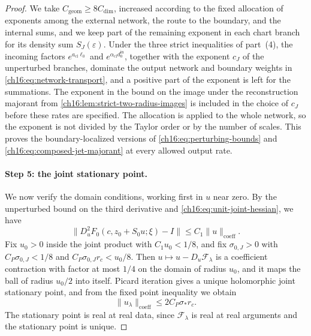\begin{proof}
We take $C_{\mathrm{geom}}\ge8C_{\mathrm{dim}}$, increased according to the fixed allocation of exponents among the external network, the route to the boundary, and the internal sums, and we keep part of the remaining exponent in each chart branch for its density sum $S_J(\varepsilon)$. Under the three strict inequalities of part~(4), the incoming factors $e^{a_{\mathrm{cl}}\ell_0}$ and $e^{\alpha_{\mathrm{cl}}d_0^{\mathrm{in}}}$, together with the exponent $c_J$ of the unperturbed branches, dominate the output network and boundary weights in \eqref{ch16:eq:network-transport}, and a positive part of the exponent is left for the summations. The exponent in the bound on the image under the reconstruction majorant from \cref{ch16:lem:strict-two-radius-images} is included in the choice of $c_J$ before these rates are specified. The allocation is applied to the whole network, so the exponent is not divided by the Taylor order or by the number of scales. This proves the boundary-localized versions of \eqref{ch16:eq:perturbing-bounds} and \eqref{ch16:eq:composed-jet-majorant} at every allowed output rate.

\paragraph{Step 5: the joint stationary point.}
We now verify the domain conditions, working first in $u$ near zero. By the unperturbed bound on the third derivative and \eqref{ch16:eq:unit-joint-hessian}, we have
\[
 \|D_u^2F_0(c,z_0+S_0u;\xi)-I\|\le C_1\|u\|_{\mathrm{coeff}}.
\]
Fix $u_0>0$ inside the joint product with $C_1u_0<1/8$, and fix $\sigma_{0,J}>0$ with $C_P\sigma_{0,J}<1/8$ and $C_P\sigma_{0,J}r_c<u_0/8$. Then $u\mapsto u-D_u\mathcal F_\lambda$ is a coefficient contraction with factor at most $1/4$ on the domain of radius $u_0$, and it maps the ball of radius $u_0/2$ into itself. Picard iteration gives a unique holomorphic joint stationary point, and from the fixed point inequality we obtain
\begin{equation}\label{ch16:eq:joint-perturbed-displacement}
 \|u_\lambda\|_{\mathrm{coeff}}
           \le 2C_P\sigma_*r_c.
\end{equation}
The stationary point is real at real data, since $\mathcal F_\lambda$ is real at real arguments and the stationary point is unique.


\end{proof}
